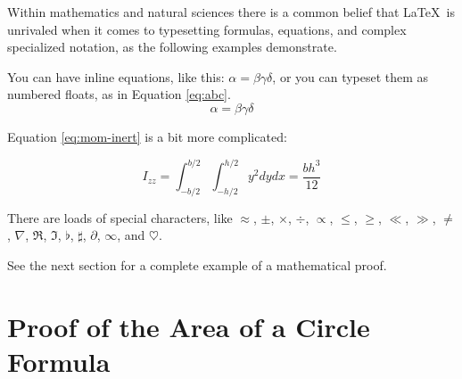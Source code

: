 \begin{table}[!h]
\centering
{}
\caption{Complex table}
\label{tab:complex}
\end{table}

Within mathematics and natural sciences there is a common belief that \LaTeX\ is unrivaled when it comes to typesetting formulas, equations, and complex specialized notation, as the following examples demonstrate.

You can have inline equations, like this: $ \alpha = \beta \gamma \delta $, or you can typeset them as numbered floats, as in Equation \ref{eq:abc}.
\begin{equation}
  \alpha = \beta \gamma \delta
  \label{eq:abc}
\end{equation}

Equation \ref{eq:mom-inert} is a bit more complicated:

\begin{equation}
  I_{zz} = \int_{-b/2}^{b/2} \int_{-h/2}^{h/2} y^2 dy dx = \frac{b h^3}{12}
  \label{eq:mom-inert}
\end{equation}

There are loads of special characters, like $\approx$, $\pm$,
$\times$, $\div$, $\propto$, $\leq$, $\geq$, $\ll$, $\gg$, $\neq$,
$\nabla$, $\Re$, $\Im$, $\flat$, $\sharp$, $\partial$, $\infty$, and $\heartsuit$.


See the next section for a complete example of a mathematical proof.

\section{Proof of the Area of a Circle Formula}

